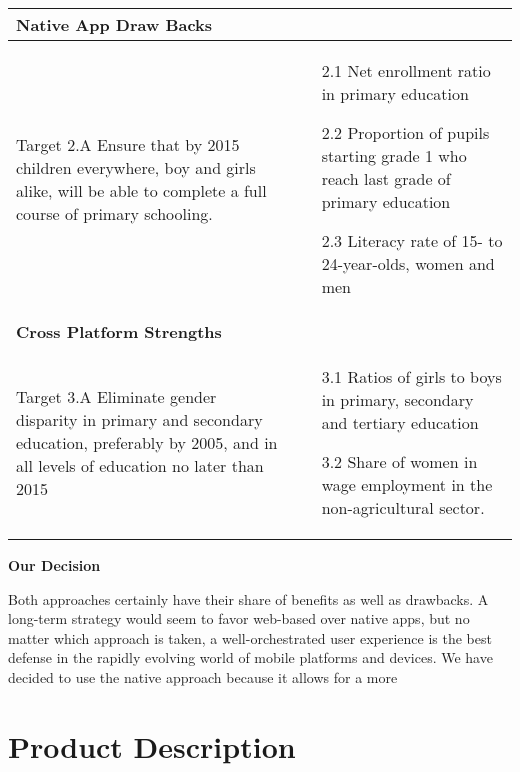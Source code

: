 \begin{center}
\begin{tabularx}{\textwidth}[t]{XX}
\arrayrulecolor{green}\hline
\textbf{\textcolor{myGreen}{Native App Draw Backs}} \\
\hline

Target 2.A Ensure that by 2015 children everywhere, boy and girls alike, will be able to complete a full course of primary schooling. &
\begin{minipage}[t]{\linewidth}%
\begin{itemize}
\item[2.1] Net enrollment ratio in primary education
\item[2.2] Proportion of pupils starting grade 1 who reach last grade of primary education
\item[2.3] Literacy rate of 15- to 24-year-olds, women and men
\end{itemize}
\end{minipage}\\

\hline
\multicolumn{2}{l}{%
\textbf{\textcolor{myGreen}{Cross Platform Strengths}}} \\
\hline

Target 3.A Eliminate gender disparity in primary and secondary education, preferably by 2005, and in all levels of education no later than 2015 &
\begin{minipage}[t]{\linewidth}%
\begin{itemize}
\item[3.1] Ratios of girls to boys in primary, secondary and tertiary education
\item[3.2] Share of women in wage employment in the non-agricultural sector.
\end{itemize} 
\end{minipage}
\end{tabularx}
\end{center}


\textbf{Our Decision}

Both approaches certainly have their share of benefits as well as drawbacks. A long-term strategy would seem to favor web-based over native apps, but no matter which approach is taken, a well-orchestrated user experience is the best defense in the rapidly evolving world of mobile platforms and devices. We have decided to use the native approach because it allows for a more 

\section{Product Description}

